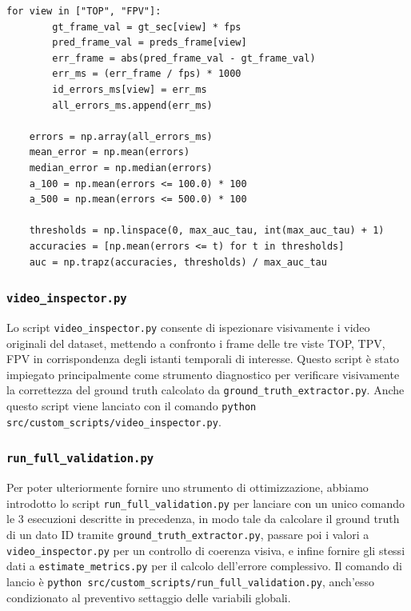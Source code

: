 \begin{lstlisting}[style=pythonstyle, caption={Calcolo delle metriche}, label={lst:compute_metrics}]
    for view in ["TOP", "FPV"]:
        gt_frame_val = gt_sec[view] * fps
        pred_frame_val = preds_frame[view]
        err_frame = abs(pred_frame_val - gt_frame_val)
        err_ms = (err_frame / fps) * 1000
        id_errors_ms[view] = err_ms
        all_errors_ms.append(err_ms)
        
    errors = np.array(all_errors_ms)
    mean_error = np.mean(errors)
    median_error = np.median(errors)
    a_100 = np.mean(errors <= 100.0) * 100
    a_500 = np.mean(errors <= 500.0) * 100
    
    thresholds = np.linspace(0, max_auc_tau, int(max_auc_tau) + 1)
    accuracies = [np.mean(errors <= t) for t in thresholds]
    auc = np.trapz(accuracies, thresholds) / max_auc_tau    
\end{lstlisting}

\subsubsection{\texttt{video\_inspector.py}}
Lo script \texttt{video\_inspector.py} consente di ispezionare visivamente i video originali del dataset, mettendo a confronto i frame delle tre viste TOP, TPV, FPV in corrispondenza degli istanti temporali di interesse. Questo script è stato impiegato principalmente come strumento diagnostico per verificare visivamente la correttezza del ground truth calcolato da \texttt{ground\_truth\_extractor.py}. Anche questo script viene lanciato con il comando \texttt{python src/custom\_scripts/video\_inspector.py}.

\subsubsection{\texttt{run\_full\_validation.py}}
Per poter ulteriormente fornire uno strumento di ottimizzazione, abbiamo introdotto lo script \texttt{run\_full\_validation.py} per lanciare con un unico comando le 3 esecuzioni descritte in precedenza, in modo tale da calcolare il ground truth di un dato ID tramite \texttt{ground\_truth\_extractor.py}, passare poi i valori a \texttt{video\_inspector.py} per un controllo di coerenza visiva, e infine fornire gli stessi dati a \texttt{estimate\_metrics.py} per il calcolo dell'errore complessivo. Il comando di lancio è \texttt{python src/custom\_scripts/run\_full\_validation.py}, anch'esso condizionato al preventivo settaggio delle variabili globali.


